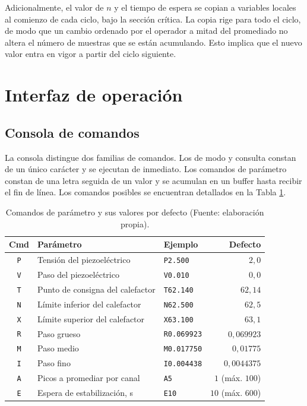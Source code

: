 Adicionalmente, el valor de $n$ y el tiempo de espera se copian a variables locales al comienzo de cada ciclo, bajo la sección crítica. La copia rige para todo el ciclo, de modo que un cambio ordenado por el operador a mitad del promediado no altera el número de muestras que se están acumulando. Esto implica que el nuevo valor entra en vigor a partir del ciclo siguiente.

\section{Interfaz de operación}
\label{sec:fw-consola}

\subsection{Consola de comandos}

La consola distingue dos familias de comandos. Los de modo y consulta constan de un único carácter y se ejecutan de inmediato. Los comandos de parámetro constan de una letra seguida de un valor y se acumulan en un buffer hasta recibir el fin de línea. Los comandos posibles se encuentran detallados en la Tabla \ref{tab:fw-params}.

\begin{table}[htbp]
\centering
  \begin{tabular}{@{}cllr@{}}
  \toprule
  \textbf{Cmd} & \textbf{Parámetro} & \textbf{Ejemplo} & \textbf{Defecto} \\
  \midrule
  \texttt{P} & Tensión del piezoeléctrico        & \texttt{P2.500}    & $2{,}0$ \\
  \texttt{V} & Paso del piezoeléctrico           & \texttt{V0.010}    & $0{,}0$ \\
  \texttt{T} & Punto de consigna del calefactor  & \texttt{T62.140}   & $62{,}14$ \\
  \texttt{N} & Límite inferior del calefactor    & \texttt{N62.500}   & $62{,}5$ \\
  \texttt{X} & Límite superior del calefactor    & \texttt{X63.100}   & $63{,}1$ \\
  \texttt{R} & Paso grueso                       & \texttt{R0.069923} & $0{,}069923$ \\
  \texttt{M} & Paso medio                        & \texttt{M0.017750} & $0{,}01775$ \\
  \texttt{I} & Paso fino                         & \texttt{I0.004438} & $0{,}0044375$ \\
  \texttt{A} & Picos a promediar por canal       & \texttt{A5}        & $1$ (máx. $100$) \\
  \texttt{E} & Espera de estabilización, s       & \texttt{E10}       & $10$ (máx. $600$) \\
  \bottomrule
  \end{tabular}
  \caption{Comandos de parámetro y sus valores por defecto (Fuente: elaboración propia).}
\label{tab:fw-params}
\end{table}

